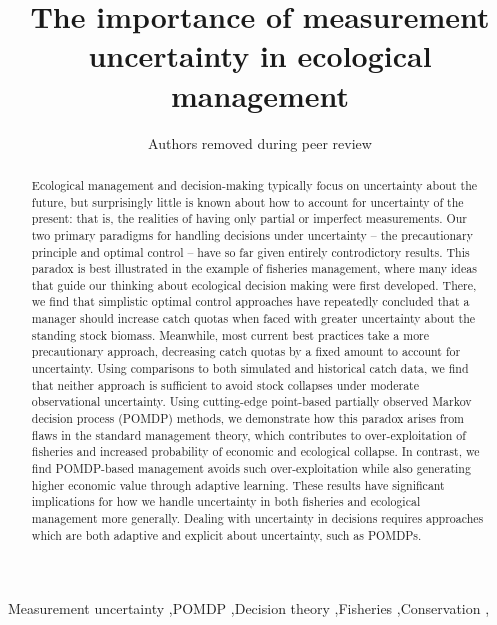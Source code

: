 \documentclass[3p]{elsarticle} %
\begin{document}
\begin{frontmatter}

  \title{The importance of measurement uncertainty in ecological management}
    \author[]{Authors removed during peer review}
  
  
    
  \begin{abstract}
  Ecological management and decision-making typically focus on uncertainty
  about the future, but surprisingly little is known about how to account
  for uncertainty of the present: that is, the realities of having only
  partial or imperfect measurements. Our two primary paradigms for
  handling decisions under uncertainty -- the precautionary principle and
  optimal control -- have so far given entirely controdictory results.
  This paradox is best illustrated in the example of fisheries management,
  where many ideas that guide our thinking about ecological decision
  making were first developed. There, we find that simplistic optimal
  control approaches have repeatedly concluded that a manager should
  increase catch quotas when faced with greater uncertainty about the
  standing stock biomass. Meanwhile, most current best practices take a
  more precautionary approach, decreasing catch quotas by a fixed amount
  to account for uncertainty. Using comparisons to both simulated and
  historical catch data, we find that neither approach is sufficient to
  avoid stock collapses under moderate observational uncertainty. Using
  cutting-edge point-based partially observed Markov decision process
  (POMDP) methods, we demonstrate how this paradox arises from flaws in
  the standard management theory, which contributes to over-exploitation
  of fisheries and increased probability of economic and ecological
  collapse. In contrast, we find POMDP-based management avoids such
  over-exploitation while also generating higher economic value through
  adaptive learning. These results have significant implications for how
  we handle uncertainty in both fisheries and ecological management more
  generally. Dealing with uncertainty in decisions requires approaches
  which are both adaptive and explicit about uncertainty, such as POMDPs.
  \end{abstract}
   \begin{keyword} Measurement uncertainty \sep POMDP \sep Decision theory \sep Fisheries \sep Conservation \sep \end{keyword}
 \end{frontmatter}
\end{document}
